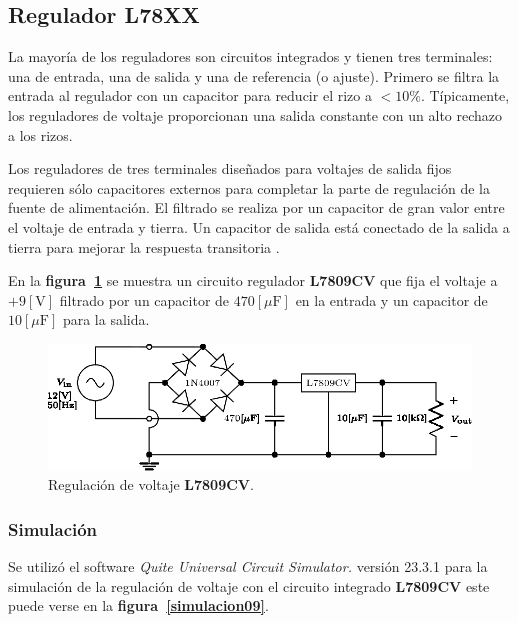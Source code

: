 \subsection{Regulador L78XX}
La mayoría de los reguladores son circuitos integrados y tienen tres terminales:
una de entrada, una de salida y una de referencia (o ajuste). Primero se filtra
la entrada al regulador con un capacitor para reducir el rizo a $<10\%$.
Típicamente, los reguladores de voltaje proporcionan una salida constante con un
alto rechazo a los rizos.

Los reguladores de tres terminales diseñados para voltajes de salida fijos
requieren sólo capacitores externos para completar la parte de regulación de la
fuente de alimentación. El filtrado se realiza por un capacitor de gran valor
entre el voltaje de entrada y tierra. Un capacitor de salida está conectado de
la salida a tierra para mejorar la respuesta transitoria \cite{Floyd}.

En la \textbf{figura~\ref{circuito09}} se muestra un circuito regulador
\textbf{L7809CV} que fija el voltaje a $+9[\text{V}]$ filtrado por un capacitor
de $470[\mu\text{F}]$ en la entrada y un capacitor de $10[\mu\text{F}]$ para la
salida.

\begin{figure}[!h]
\centering
\includegraphics[scale=1.20]{diagramas/09.regulador1.eps}
\caption{Regulación de voltaje \textbf{L7809CV}.}
\label{circuito09}
\end{figure}

\subsubsection{Simulación}
Se utilizó el software \emph{Quite Universal Circuit Simulator.} versión 23.3.1
para la simulación de la regulación de voltaje con el circuito integrado
\textbf{L7809CV} este puede verse en la \textbf{figura~\ref{simulacion09}}.

